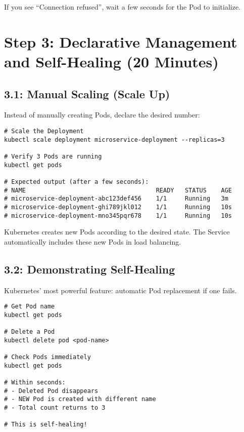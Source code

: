 \documentclass[12pt,a4paper]{article}
\begin{document}
\begin{tipbox}
If you see ``Connection refused'', wait a few seconds for the Pod to initialize.
\end{tipbox}

\newpage

\section{Step 3: Declarative Management and Self-Healing (20 Minutes)}

\subsection{3.1: Manual Scaling (Scale Up)}

Instead of manually creating Pods, declare the desired number:

\begin{lstlisting}[caption=Scale to 3 replicas]
# Scale the Deployment
kubectl scale deployment microservice-deployment --replicas=3

# Verify 3 Pods are running
kubectl get pods

# Expected output (after a few seconds):
# NAME                                    READY   STATUS    AGE
# microservice-deployment-abc123def456    1/1     Running   3m
# microservice-deployment-ghi789jkl012    1/1     Running   10s
# microservice-deployment-mno345pqr678    1/1     Running   10s
\end{lstlisting}

\begin{importantbox}
Kubernetes creates new Pods according to the desired state. The Service automatically includes these new Pods in load balancing.
\end{importantbox}

\subsection{3.2: Demonstrating Self-Healing}

Kubernetes' most powerful feature: automatic Pod replacement if one fails.

\begin{lstlisting}[caption=Pod self-healing]
# Get Pod name
kubectl get pods

# Delete a Pod
kubectl delete pod <pod-name>

# Check Pods immediately
kubectl get pods

# Within seconds:
# - Deleted Pod disappears
# - NEW Pod is created with different name
# - Total count returns to 3

# This is self-healing!
\end{lstlisting}
\end{document}
